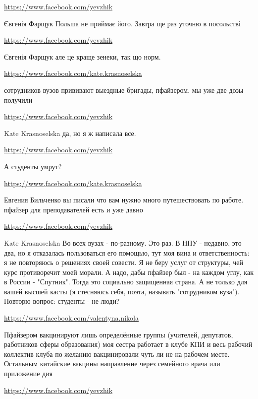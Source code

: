 \documentclass[a4paper,11pt]{extreport}
\begin{document}
\begin{itemize}
\begin{itemize}
\url{https://www.facebook.com/yevzhik}

Євгенія Фарщук Польша не приймає його. Завтра ще раз уточню в посольстві

\url{https://www.facebook.com/yevzhik}

Євгенія Фарщук але це краще зенеки, так що норм.

\end{itemize}
\url{https://www.facebook.com/kate.krasnoselska}

сотрудников вузов прививают выездные бригады, пфайзером. мы уже две дозы получили

\begin{itemize}
\url{https://www.facebook.com/yevzhik}

Kate Krasnoselska да, но я ж написала все.

\url{https://www.facebook.com/yevzhik}

А студенты умрут?

\url{https://www.facebook.com/kate.krasnoselska}

Евгения Бильченко вы писали что вам нужно много путешествовать по работе. пфайзер для преподавателей есть и уже давно

\url{https://www.facebook.com/yevzhik}

Kate Krasnoselska Во всех вузах - по-разному. Это раз. В НПУ - недавно, это два, но я отказалась пользоваться его помощью, тут моя вина и ответственность: я не повторяюсь о решениях своей совести. Я не беру услуг от структуры, чей курс противоречит моей морали. А надо, дабы пфайзер был - на каждом углу, как в России - "Спутник". Тогда это социально защищенная страна. А не только для вашей высшей касты (я стесняюсь себя, поэта, называть "сотрудником вуза"). Повторю вопрос: студенты - не люди?

\end{itemize}
\url{https://www.facebook.com/valentyna.nikola}

Пфайзером вакцинируют лишь определённые группы (учителей, депутатов, работников сферы образования) моя сестра работает в клубе КПИ и весь рабочий коллектив клуба по желанию вакцинировали чуть ли не на рабочем месте. Остальным китайские вакцины направление через семейного врача или приложение дия

\begin{itemize}
\url{https://www.facebook.com/yevzhik}


\end{itemize}
\end{itemize}
\end{document}
